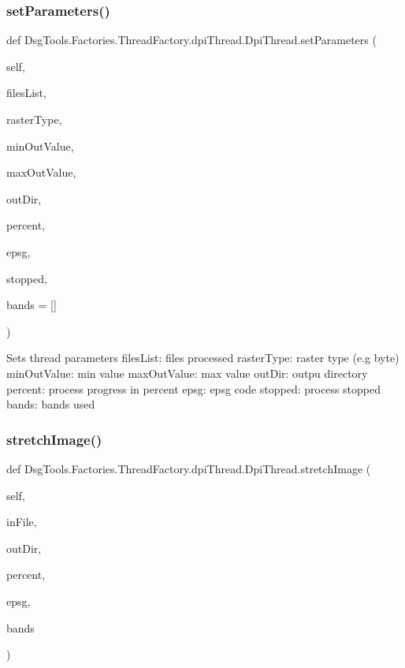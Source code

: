 \subsubsection{\texorpdfstring{set\+Parameters()}{setParameters()}}
{\footnotesize\ttfamily def Dsg\+Tools.\+Factories.\+Thread\+Factory.\+dpi\+Thread.\+Dpi\+Thread.\+set\+Parameters (\begin{DoxyParamCaption}\item[{}]{self,  }\item[{}]{files\+List,  }\item[{}]{raster\+Type,  }\item[{}]{min\+Out\+Value,  }\item[{}]{max\+Out\+Value,  }\item[{}]{out\+Dir,  }\item[{}]{percent,  }\item[{}]{epsg,  }\item[{}]{stopped,  }\item[{}]{bands = {\ttfamily \mbox{[}\mbox{]}} }\end{DoxyParamCaption})}

\begin{DoxyVerb}Sets thread parameters
filesList: files processed
rasterType: raster type (e.g byte)
minOutValue: min value
maxOutValue: max value
outDir: outpu directory
percent: process progress in percent
epsg: epsg code
stopped: process stopped
bands: bands used
\end{DoxyVerb}
 \mbox{\label{class_dsg_tools_1_1_factories_1_1_thread_factory_1_1dpi_thread_1_1_dpi_thread_af78db3a3576b633a013f78a08e6fc93e}} 
\subsubsection{\texorpdfstring{stretch\+Image()}{stretchImage()}}
{\footnotesize\ttfamily def Dsg\+Tools.\+Factories.\+Thread\+Factory.\+dpi\+Thread.\+Dpi\+Thread.\+stretch\+Image (\begin{DoxyParamCaption}\item[{}]{self,  }\item[{}]{in\+File,  }\item[{}]{out\+Dir,  }\item[{}]{percent,  }\item[{}]{epsg,  }\item[{}]{bands }\end{DoxyParamCaption})}

